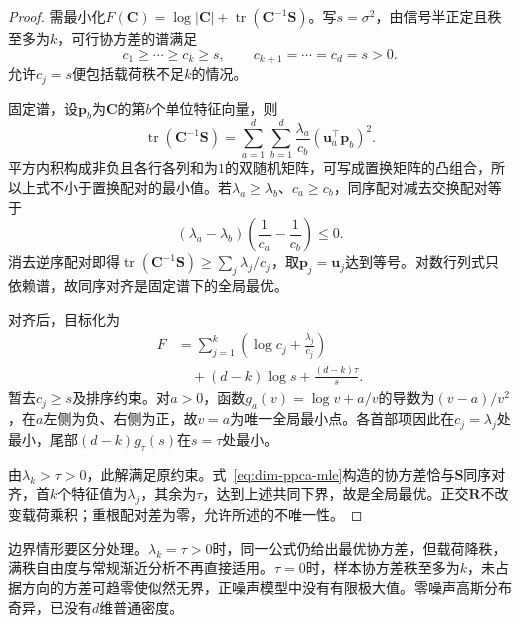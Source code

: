 \begin{proof}
需最小化$F(\bm{C})=\log|\bm{C}|+\operatorname{tr}(\bm{C}^{-1}\bm{S})$。写$s=\sigma^2$，由信号半正定且秩至多为$k$，可行协方差的谱满足
\[
c_1\geq\cdots\geq c_k\geq s,\qquad
c_{k+1}=\cdots=c_d=s>0.
\]
允许$c_j=s$便包括载荷秩不足$k$的情况。

固定谱，设$\bm{p}_b$为$\bm{C}$的第$b$个单位特征向量，则
\[
\operatorname{tr}(\bm{C}^{-1}\bm{S})
=\sum_{a=1}^d\sum_{b=1}^d
\frac{\lambda_a}{c_b}(\bm{u}_a^\top\bm{p}_b)^2.
\]
平方内积构成非负且各行各列和为$1$的双随机矩阵，可写成置换矩阵的凸组合，所以上式不小于置换配对的最小值。若$\lambda_a\geq\lambda_b$、$c_a\geq c_b$，同序配对减去交换配对等于
\[
(\lambda_a-\lambda_b)
\left(\frac{1}{c_a}-\frac{1}{c_b}\right)\leq0.
\]
消去逆序配对即得$\operatorname{tr}(\bm{C}^{-1}\bm{S})\geq\sum_j\lambda_j/c_j$，取$\bm{p}_j=\bm{u}_j$达到等号。对数行列式只依赖谱，故同序对齐是固定谱下的全局最优。

对齐后，目标化为
\[
\begin{aligned}
F&=\sum_{j=1}^k\left(\log c_j+\frac{\lambda_j}{c_j}\right)\\
&\quad+(d-k)\log s+\frac{(d-k)\tau}{s}.
\end{aligned}
\]
暂去$c_j\geq s$及排序约束。对$a>0$，函数$g_a(v)=\log v+a/v$的导数为$(v-a)/v^2$，在$a$左侧为负、右侧为正，故$v=a$为唯一全局最小点。各首部项因此在$c_j=\lambda_j$处最小，尾部$(d-k)g_\tau(s)$在$s=\tau$处最小。

由$\lambda_k>\tau>0$，此解满足原约束。式~\eqref{eq:dim-ppca-mle}构造的协方差恰与$\bm{S}$同序对齐，首$k$个特征值为$\lambda_j$，其余为$\tau$，达到上述共同下界，故是全局最优。正交$\bm{R}$不改变载荷乘积；重根配对差为零，允许所述的不唯一性。
\end{proof}

边界情形要区分处理。$\lambda_k=\tau>0$时，同一公式仍给出最优协方差，但载荷降秩，满秩自由度与常规渐近分析不再直接适用。$\tau=0$时，样本协方差秩至多为$k$，未占据方向的方差可趋零使似然无界，正噪声模型中没有有限极大值。零噪声高斯分布奇异，已没有$d$维普通密度。

